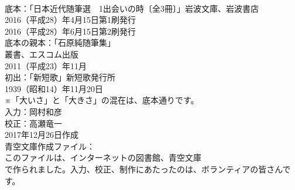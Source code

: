 \documentclass[8pt]{extreport}
\begin{document}
\begin{CJK}{UTF8}{min}
\\	底本：「日本近代随筆選　1出会いの時〔全3冊〕」岩波文庫、岩波書店
\\	2016（平成28）年4月15日第1刷発行
\\	2016（平成28）年6月15日第2刷発行
\\	底本の親本：「石原純随筆集」
\\	叢書、エスコム出版
\\	2011（平成23）年11月
\\	初出：「新短歌」新短歌発行所
\\	1939（昭和14）年11月20日
\\	※「大いさ」と「大きさ」の混在は、底本通りです。
\\	入力：岡村和彦
\\	校正：高瀬竜一
\\	2017年12月26日作成
\\	青空文庫作成ファイル：
\\	このファイルは、インターネットの図書館、青空文庫
\\	で作られました。入力、校正、制作にあたったのは、ボランティアの皆さんです。
\end{CJK}
\end{document}

